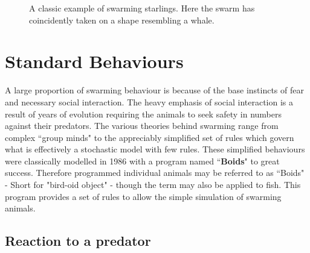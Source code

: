 \documentclass[
reprint,
showpacs,
preprintnumbers,
bibnotes,
amsmath,
amssymb,
aps,
pra,
floatfix,
]{revtex4-1}
\begin{document}
\begin{figure}[!htp]

	\caption{
		A classic example of swarming starlings.\cite{jameswainscoatphoto}
		Here the swarm has coincidently taken on a shape resembling a whale.
	}

	\label{fig:birdswarmphoto}
\end{figure}

\section{\label{sec:behaviours}Standard Behaviours}
A large proportion of swarming behaviour is because of the base instincts of fear and necessary social interaction.
The heavy emphasis of social interaction is a result of years of evolution requiring the animals to seek safety in numbers against their predators.
The various theories behind swarming range from complex ``group minds"\cite{diffusionadaption} to the appreciably simplified set of rules which govern what is effectively a stochastic model with few rules.\cite{modellingflocks}
These simplified behaviours were classically modelled in 1986 with a program named ``\textbf{Boids}"\cite{boids} to great success.
Therefore programmed individual animals may be referred to as ``Boids" - Short for "bird-oid object" - though the term may also be applied to fish.
This program provides a set of rules to allow the simple simulation of swarming animals.

\subsection{\label{sec:boidrejection}Reaction to a predator}
\end{document}

